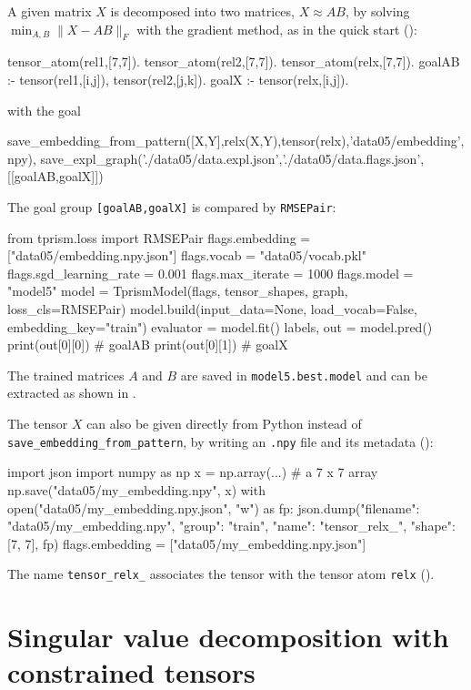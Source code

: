 \documentclass[a4paper]{report}
\begin{document}
A given matrix $X$ is decomposed into two matrices, $X\approx AB$, by
solving $\min_{A,B}\|X-AB\|_F$ with the gradient method, as in the quick
start ():
\begin{prologcode}
tensor_atom(rel1,[7,7]).
tensor_atom(rel2,[7,7]).
tensor_atom(relx,[7,7]).
goalAB :- tensor(rel1,[i,j]), tensor(rel2,[j,k]).
goalX  :- tensor(relx,[i,j]).
\end{prologcode}
with the goal
\begin{prologcode}
save_embedding_from_pattern([X,Y],relx(X,Y),tensor(relx),'data05/embedding',npy),
save_expl_graph('./data05/data.expl.json','./data05/data.flags.json',[[goalAB,goalX]])
\end{prologcode}
The goal group {\tt [goalAB,goalX]} is compared by {\tt RMSEPair}:
\begin{pythoncode}
from tprism.loss import RMSEPair
flags.embedding = ["data05/embedding.npy.json"]
flags.vocab = "data05/vocab.pkl"
flags.sgd_learning_rate = 0.001
flags.max_iterate = 1000
flags.model = "model5"
model = TprismModel(flags, tensor_shapes, graph, loss_cls=RMSEPair)
model.build(input_data=None, load_vocab=False, embedding_key="train")
evaluator = model.fit()
labels, out = model.pred()
print(out[0][0])     # goalAB
print(out[0][1])     # goalX
\end{pythoncode}
The trained matrices $A$ and $B$ are saved in {\tt model5.best.model} and
can be extracted as shown in .

The tensor $X$ can also be given directly from Python instead of {\tt
	save\_embedding\_from\_pattern}, by writing an {\tt .npy} file and its
metadata ():
\begin{pythoncode}
import json
import numpy as np
x = np.array(...)    # a 7 x 7 array
np.save("data05/my_embedding.npy", x)
with open("data05/my_embedding.npy.json", "w") as fp:
    json.dump({"filename": "data05/my_embedding.npy", "group": "train",
               "name": "tensor_relx_", "shape": [7, 7]}, fp)
flags.embedding = ["data05/my_embedding.npy.json"]
\end{pythoncode}
The name {\tt tensor\_relx\_} associates the tensor with the tensor atom {\tt relx} ().

\section{Singular value decomposition with constrained tensors}
\label{sec:tutorial_svd}
\end{document}
